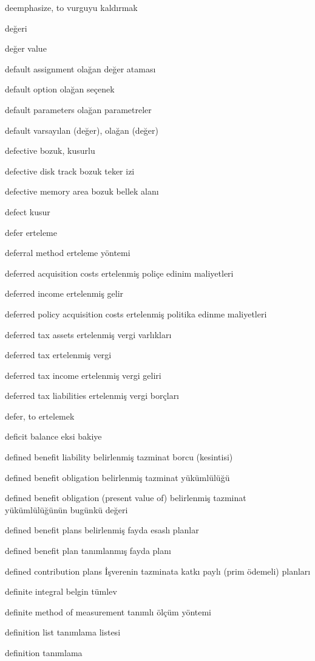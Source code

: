 \documentclass[12pt,fleqn]{article}\usepackage{../../common}
\begin{document}
deemphasize, to vurguyu kaldırmak

değeri

değer value

default assignment olağan değer ataması

default option olağan seçenek

default parameters olağan parametreler

default varsayılan (değer), olağan (değer)

defective bozuk, kusurlu

defective disk track bozuk teker izi

defective memory area bozuk bellek alanı

defect kusur

defer erteleme

deferral method erteleme yöntemi

deferred acquisition costs ertelenmiş poliçe edinim maliyetleri

deferred income ertelenmiş gelir

deferred policy acquisition costs ertelenmiş politika edinme maliyetleri

deferred tax assets ertelenmiş vergi varlıkları

deferred tax ertelenmiş vergi

deferred tax income ertelenmiş vergi geliri

deferred tax liabilities ertelenmiş vergi borçları

defer, to ertelemek

deficit balance eksi bakiye

defined benefit liability belirlenmiş tazminat borcu (kesintisi)

defined benefit obligation belirlenmiş tazminat yükümlülüğü

defined benefit obligation (present value of) belirlenmiş tazminat yükümlülüğünün bugünkü değeri

defined benefit plans belirlenmiş fayda esaslı planlar

defined benefit plan tanımlanmış fayda planı

defined contribution plans İşverenin tazminata katkı paylı (prim ödemeli) planları

definite integral belgin tümlev

definite method of measurement tanımlı ölçüm yöntemi

definition list tanımlama listesi

definition tanımlama
\end{document}
